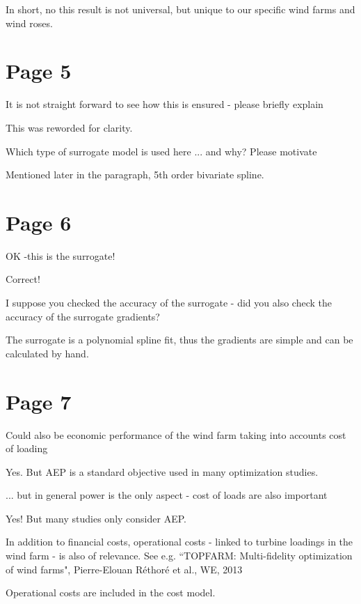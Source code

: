 \documentclass[12pt]{report}
\begin{document}
In short, no this result is not universal, but unique to our specific wind farms and wind roses.

\bigskip \color{black}
\section*{Page 5}
\bigskip \color{black}
It is not straight forward to see how this is ensured - please briefly explain

\color{blue} This was reworded for clarity.

\bigskip \color{black}
Which type of surrogate model is used here ... and why? Please motivate

\color{blue} Mentioned later in the paragraph, 5th order bivariate spline.

\bigskip \color{black}
\section*{Page 6}
\bigskip \color{black}
OK -this is the surrogate!

\color{blue} Correct!

\bigskip \color{black}
I suppose you checked the accuracy of the surrogate - did you also check the accuracy of the surrogate gradients?

\color{blue} The surrogate is a polynomial spline fit, thus the gradients are simple and can be calculated by hand.

\bigskip \color{black}
\section*{Page 7}
\bigskip \color{black}
Could also be economic performance of the wind farm taking into accounts cost of loading

\color{blue}  Yes. But AEP is a standard objective used in many optimization studies.

\bigskip \color{black}
... but in general power is the only aspect - cost of loads are also important

\color{blue} Yes! But many studies only consider AEP.

\bigskip \color{black}
In addition to financial costs, operational costs - linked to turbine loadings in the wind farm - is also of relevance. See e.g.  ``TOPFARM: Multi-fidelity optimization of wind farms",
Pierre-Elouan Réthoré et al., WE, 2013

\color{blue} Operational costs are included in the cost model.
\end{document}

